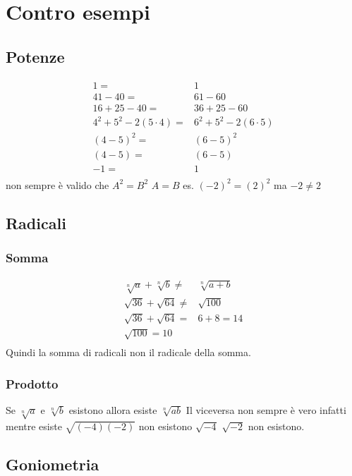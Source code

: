 \chapter{Contro esempi}
\section{Potenze}
\begin{cexmp}[Esistenza]
	\begin{align*}
	1=&1\\
	41-40=&61-60\\
	16+25-40=&36+25-60\\
	4^2+5^2-2(5\cdot 4)=&6^2+5^2-2(6\cdot 5)\\
	(4-5)^2=&(6-5)^2\\
	(4-5)=&(6-5)\\
	-1=&1\\
	\end{align*}
	non sempre è valido che $A^2=B^2$ $A=B$ es. $(-2)^2=(2)^2$ ma $-2\neq 2$
\end{cexmp}
\section{Radicali}
\subsection{Somma}
\begin{cexmp}
\begin{align*}
\sqrt[n]{a}+\sqrt[n]{b}\neq&\sqrt[n]{a+b}\\
\sqrt{36}+\sqrt{64}\neq&\sqrt{100}\\
\sqrt{36}+\sqrt{64}=&6+8=14\\
\sqrt{100}=10\\
\end{align*}
Quindi la somma di radicali non il radicale della somma.
\end{cexmp}
\subsection{Prodotto}
\begin{cexmp}[Esistenza]
	Se $\sqrt[n]{a}$ e $\sqrt[n]{b}$ esistono allora esiste $\sqrt[n]{ab}$ Il viceversa non sempre è vero infatti mentre esiste $\sqrt{(-4)(-2)}$ non esistono   $\sqrt{-4}$ $\sqrt{-2}$ non esistono.
\end{cexmp}
\section{Goniometria}
